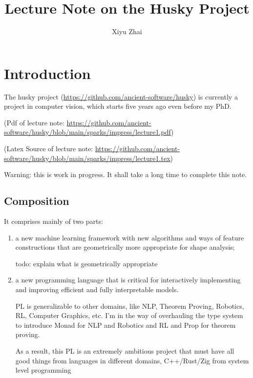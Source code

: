 \documentclass[11pt, oneside]{article}   	%
\title{Lecture Note on the Husky Project}
\author{Xiyu Zhai}
\date{}							%
\theoremstyle{definition}
\begin{document}
\maketitle
\tableofcontents
\section{Introduction}

The husky project (\url{https://github.com/ancient-software/husky}) is currently a project in computer vision, which starts five years ago even before my PhD.

(Pdf of lecture note: \url{https://github.com/ancient-software/husky/blob/main/sparks/impress/lecture1.pdf})

(Latex Source of lecture note: \url{https://github.com/ancient-software/husky/blob/main/sparks/impress/lecture1.tex})

Warning: this is work in progress. It shall take a long time to complete this note.

\subsection{Composition}

It comprises mainly of two parts:
\begin{enumerate}[(1)]
	\item a new machine learning framework with new algorithms and ways of feature constructions that are geometrically more appropriate for shape analysis;

	\begin{rmk}
	todo: explain what is geometrically appropriate
	\end{rmk}
	\item a new programming language that is critical for interactively implementing and improving efficient and fully interpretable models.

	\begin{rmk}
		PL is generalizable to other domains, like NLP, Theorem Proving, Robotics, RL, Computer Graphics, etc. I'm in the way of overhauling the type system to introduce Monad for NLP and Robotics and RL and Prop for theorem proving.

		As a result, this PL is an extremely ambitious project that must have all good things from languages in different domains, C++/Rust/Zig from system level programming
	\end{rmk}
\end{enumerate}
\end{document}
